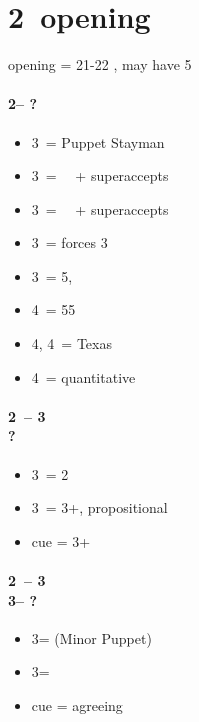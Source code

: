 \documentclass[12pt, a4paper]{report}
\begin{document}
\chapter*{\colorbox{Plum!30}{2\ntch\ opening}}
 {
    
    \alrts{2\nt} opening = 21-22 \bal, may have 5\major

    \subsubsection*{2\nt -- ?}
    \begin{itemize}
        \item 3\clubs\ = Puppet Stayman
        \item 3\diams\ = \then\ \hearts\ + superaccepts
        \item 3\hearts\ = \then\ \spades\ + superaccepts
        \item 3\spades\ = forces 3\nt
        \item 3\nt\ = 5\hearts, \nf \imp
        \item 4\clubs\ = 55\major
        \item 4\diams, 4\hearts\ = Texas
        \item 4\nt\ = quantitative
    \end{itemize}

    \subsubsection*{2\ntx\ -- 3\diams \\ ?}
    \begin{itemize}
        \item 3\hearts\ = 2\hearts
        \item 3\nt\ = 3+\hearts, propositional
        \item cue = 3+\hearts
    \end{itemize}

    \subsubsection*{2\ntx\ -- 3\diams \\
                    3\hearts -- ?}
    \begin{itemize}
        \item 3\spades = \nt (\then Minor Puppet)
        \item 3\nt = \spades \nat
        \item cue = agreeing \hearts
    \end{itemize}

}
\end{document}
